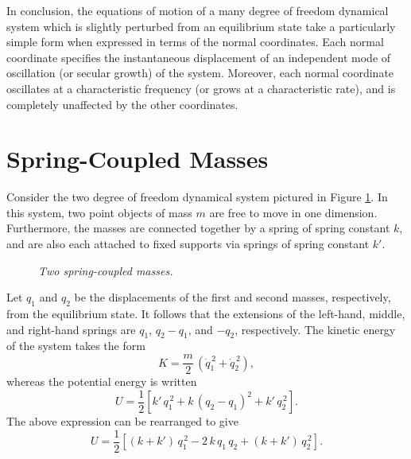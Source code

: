 In conclusion, the  equations of motion of a many degree of
freedom dynamical system which is slightly perturbed from an equilibrium state take a particularly simple form when expressed
in terms of the normal coordinates. Each normal
coordinate specifies the instantaneous displacement of an independent 
mode of oscillation (or secular growth) of the system. Moreover, each
normal coordinate oscillates at a characteristic frequency (or grows at a characteristic rate), and is completely unaffected by the other coordinates.

\section{Spring-Coupled Masses}
Consider the two degree of freedom dynamical system pictured in Figure \ref{spring}. In this system, two point objects of mass $m$ are free
to move in one dimension.  Furthermore, the masses are 
connected together by a spring of spring constant $k$, and are also each attached to
 fixed supports via  springs of spring constant $k'$. 
\begin{figure}
\centerline{}
\caption{\em Two spring-coupled masses.}\label{spring}
\end{figure}

Let $q_1$ and $q_2$ be the displacements of the first and second masses,
respectively, from the equilibrium state. It follows that the
extensions of the left-hand, middle, and right-hand springs are 
$q_1$, $q_2-q_1$, and $-q_2$, respectively. The kinetic energy of the system takes the
form
\begin{equation}\label{e12.51}
K = \frac{m}{2} \,(\dot{q}_1^{\,2} + \dot{q}_2^{\,2}),
\end{equation}
whereas the potential energy is written
\begin{equation}
U= \frac{1}{2}\left[k'\,q_1^{\,2} + k\,(q_2-q_1)^2+ k'\,q_2^{\,2}\right].
\end{equation}
The above expression can be rearranged to give
\begin{equation}\label{e12.53}
U= \frac{1}{2}\left[(k+k')\,q_1^{\,2} -2\,k\,q_1\,q_2 + (k+k')\,q_2^{\,2}\right].
\end{equation}

